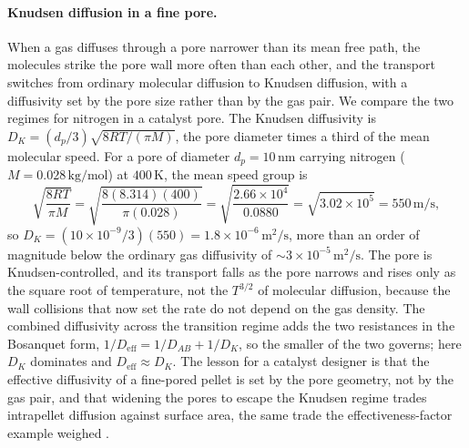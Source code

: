 \paragraph{Knudsen diffusion in a fine pore.} When a gas diffuses through a
pore narrower than its mean free path, the molecules strike the pore wall more
often than each other, and the transport switches from ordinary molecular
diffusion to Knudsen diffusion, with a diffusivity set by the pore size rather
than by the gas pair. We compare the two regimes for nitrogen in a catalyst
pore. The Knudsen diffusivity is $D_K = (d_p/3)\sqrt{8RT/(\pi M)}$, the pore
diameter times a third of the mean molecular speed. For a pore of diameter
$d_p = 10\,\si{\nano\meter}$ carrying nitrogen ($M = 0.028\,\text{kg/mol}$) at
$400\,\si{\kelvin}$, the mean speed group is
\[
\sqrt{\frac{8RT}{\pi M}} = \sqrt{\frac{8(8.314)(400)}{\pi(0.028)}} =
\sqrt{\frac{2.66\times 10^{4}}{0.0880}} = \sqrt{3.02\times 10^{5}} =
550\,\text{m/s},
\]
so $D_K = (10\times 10^{-9}/3)(550) = 1.8\times 10^{-6}\,\si{\meter\squared
\per\second}$, more than an order of magnitude below the ordinary gas
diffusivity of $\sim 3\times 10^{-5}\,\si{\meter\squared\per\second}$. The
pore is Knudsen-controlled, and its transport falls as the pore narrows and
rises only as the square root of temperature, not the $T^{3/2}$ of molecular
diffusion, because the wall collisions that now set the rate do not depend on
the gas density. The combined diffusivity across the transition regime adds
the two resistances in the Bosanquet form, $1/D_{\text{eff}} = 1/D_{AB} +
1/D_K$, so the smaller of the two governs; here $D_K$ dominates and
$D_{\text{eff}} \approx D_K$. The lesson for a catalyst designer is that the
effective diffusivity of a fine-pored pellet is set by the pore geometry, not
by the gas pair, and that widening the pores to escape the Knudsen regime
trades intrapellet diffusion against surface area, the same trade the
effectiveness-factor example weighed \cite{text:bird-transport-phenomena}.

